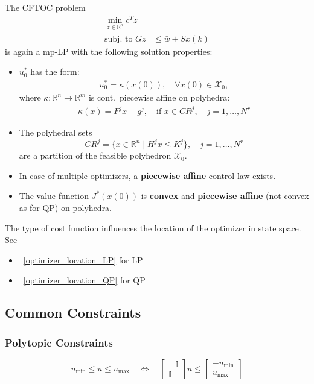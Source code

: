 The CFTOC problem
\begin{align*}
    \min_{z\in\mathbb{R}^n}c^T z                            \\
    \text{subj.\ to } \bar{G}z & \leq \bar{w} + \bar{S}x(k)
\end{align*}
is again a mp-LP with the following solution properties:
\begin{itemize}
    \item $u_0^*$ has the form:
          \begin{align*}
              u_0^* = \kappa(x(0)), \quad \forall x(0) \in \mathcal{X}_0,
          \end{align*}
          where $\kappa : \mathbb{R}^n \to \mathbb{R}^m$ is cont.\, piecewise affine on polyhedra:
          \begin{align*}
              \kappa(x) = F^j x + g^j, \quad \text{if } x \in CR^j, \quad j = 1, \dots, N^r
          \end{align*}
    \item The polyhedral sets
          \begin{equation*}
              CR^j = \{x \in \mathbb{R}^n \mid H^j x \leq K^j\}, \quad j = 1, \dots, N^r
          \end{equation*}
          are a partition of the feasible polyhedron $\mathcal{X}_0$.
    \item In case of multiple optimizers, a \textbf{piecewise affine} control law exists.
    \item The value function $J^*(x(0))$ is \textbf{convex} and \textbf{piecewise affine} (not convex as for QP) on polyhedra.
\end{itemize}

\newpar{}

The type of cost function influences the location of the optimizer in state space. See
\begin{itemize}
    \item\ \ref{optimizer_location_LP} for LP
    \item\ \ref{optimizer_location_QP} for QP
\end{itemize}

\subsection{Common Constraints}
\subsubsection{Polytopic Constraints}
\begin{equation*}
    u_{\min} \leq u \leq u_{\max} \quad \Leftrightarrow \quad \begin{bmatrix}
        -\mathbb{I} \\
        \mathbb{I}
    \end{bmatrix} u \leq \begin{bmatrix}
        -u_{\min} \\
        u_{\max}
    \end{bmatrix}
\end{equation*}

